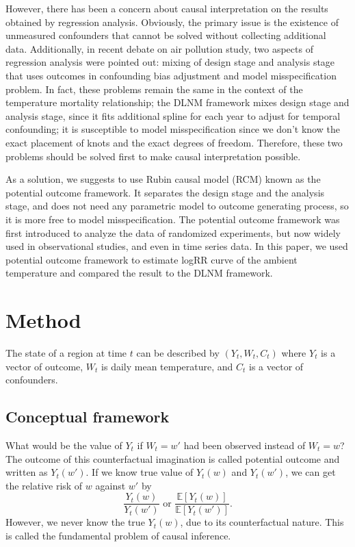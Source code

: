 \documentclass[12pt]{article}
\begin{document}
However, there has been a concern about causal interpretation 
on the results obtained by regression analysis.
Obviously, the primary issue is the existence of unmeasured confounders
that cannot be solved without collecting additional data.
Additionally, in recent debate on air pollution study\cite{dominici2019sci},
two aspects of regression analysis were pointed out:
mixing of design stage and analysis stage 
that uses outcomes in confounding bias adjustment\cite{rubin2008}
and model misspecification problem.
In fact, these problems remain the same in the context of the temperature mortality relationship;
the DLNM framework mixes design stage and analysis stage,
since it fits additional spline for each year to adjust for temporal confounding;
it is susceptible to model misspecification\cite{gasparrini2016}
since we don't know the exact placement of knots and the exact degrees of freedom.
Therefore, these two problems should be solved first to make causal interpretation possible.

As a solution, we suggests to use Rubin causal model (RCM)\cite{holland1986}
known as the potential outcome framework.
It separates the design stage and the analysis stage,
and does not need any parametric model to outcome generating process,
so it is more free to model misspecification.
The potential outcome framework was first introduced 
to analyze the data of randomized experiments\cite{rubin1974},
but now widely used in observational studies\cite{wu2020sciadv},
and even in time series data\cite{angrist2018}.
In this paper, we used potential outcome framework to estimate logRR curve of the ambient temperature 
and compared the result to the DLNM framework.

\section{Method}

The state of a region at time $t$ can be described by $(Y_t, W_t, C_t)$ 
where $Y_t$ is a vector of outcome, $W_t$ is daily mean temperature, 
and $C_t$ is a vector of confounders.

\subsection{Conceptual framework}

What would be the value of $Y_t$ if $W_t = w'$ had been observed instead of $W_t = w$? %
The outcome of this counterfactual imagination is called potential outcome and written as $Y_t(w')$.
If we know true value of $Y_t(w)$ and $Y_t(w')$, we can get the relative risk of $w$ against $w'$ by
\[
	\frac{Y_t(w)}{Y_t(w')} \text{ or } 
	\frac{\mathbb{E}\left[ Y_t(w) \right]}{\mathbb{E}\left[ Y_t(w') \right]}.
\]
However, we never know the true $Y_t(w)$, due to its counterfactual nature.
This is called the fundamental problem of causal inference\cite{holland1986}.
\end{document}

